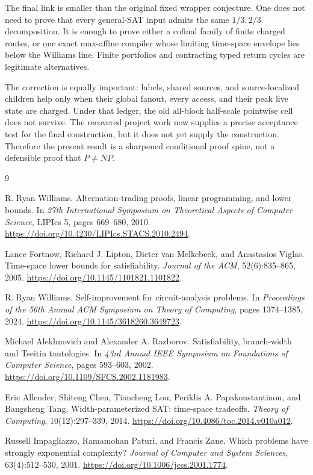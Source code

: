 \documentclass[11pt]{article}
\begin{document}
The final link is smaller than the original fixed wrapper conjecture.  One
does not need to prove that every general-SAT input admits the same
$1/3,2/3$ decomposition.  It is enough to prove either a cofinal family of
finite charged routes, or one exact max-affine compiler whose limiting
time-space envelope lies below the Williams line.  Finite portfolios and
contracting typed return cycles are legitimate alternatives.

The correction is equally important: labels, shared sources, and
source-localized children help only when their global fanout, every access,
and their peak live state are charged.  Under that ledger, the old all-block
half-scale pointwise cell does not survive.  The recovered project work now
supplies a precise acceptance test for the final construction, but it does not
yet supply the construction.  Therefore the present result is a sharpened
conditional proof spine, not a defensible proof that $P\ne NP$.

\begin{thebibliography}{9}

R. Ryan Williams.
\newblock Alternation-trading proofs, linear programming, and lower bounds.
\newblock In \emph{27th International Symposium on Theoretical Aspects of
Computer Science}, LIPIcs 5, pages 669--680, 2010.
\newblock \url{https://doi.org/10.4230/LIPIcs.STACS.2010.2494}.

Lance Fortnow, Richard J. Lipton, Dieter van Melkebeek, and Anastasios Viglas.
\newblock Time-space lower bounds for satisfiability.
\newblock \emph{Journal of the ACM}, 52(6):835--865, 2005.
\newblock \url{https://doi.org/10.1145/1101821.1101822}.

R. Ryan Williams.
\newblock Self-improvement for circuit-analysis problems.
\newblock In \emph{Proceedings of the 56th Annual ACM Symposium on Theory of
Computing}, pages 1374--1385, 2024.
\newblock \url{https://doi.org/10.1145/3618260.3649723}.

Michael Alekhnovich and Alexander A. Razborov.
\newblock Satisfiability, branch-width and Tseitin tautologies.
\newblock In \emph{43rd Annual IEEE Symposium on Foundations of Computer
Science}, pages 593--603, 2002.
\newblock \url{https://doi.org/10.1109/SFCS.2002.1181983}.

Eric Allender, Shiteng Chen, Tiancheng Lou, Periklis A. Papakonstantinou, and
Bangsheng Tang.
\newblock Width-parameterized SAT: time-space tradeoffs.
\newblock \emph{Theory of Computing}, 10(12):297--339, 2014.
\newblock \url{https://doi.org/10.4086/toc.2014.v010a012}.

Russell Impagliazzo, Ramamohan Paturi, and Francis Zane.
\newblock Which problems have strongly exponential complexity?
\newblock \emph{Journal of Computer and System Sciences}, 63(4):512--530,
2001.
\newblock \url{https://doi.org/10.1006/jcss.2001.1774}.

\end{thebibliography}

\end{document}
